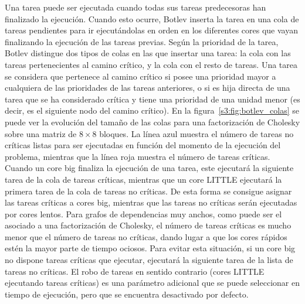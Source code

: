 Una tarea puede ser ejecutada cuando todas sus tareas predecesoras han
finalizado la ejecución. Cuando esto ocurre, Botlev inserta la tarea en una
cola de tareas pendientes para ir ejecutándolas en orden en los diferentes
cores que vayan finalizando la ejecución de las tareas previas. Según la
prioridad de la tarea, Botlev distingue dos tipos de colas en las que
insertar una tarea: la cola con las tareas pertenecientes al camino
crítico, y la cola con el resto de tareas. Una tarea se considera que
pertenece al camino crítico si posee una prioridad mayor a cualquiera de
las prioridades de las tareas anteriores, o si es hija directa de una tarea
que se ha considerado crítica y tiene una prioridad de una unidad menor (es
decir, es el siguiente nodo del camino crítico). En la
figura~\ref{s3:fig:botlev_colas} se puede ver la evolución del tamaño de
las colas para una factorización de Cholesky sobre una matriz de $8\times8$
bloques. La línea azul muestra el número de tareas no críticas listas para
ser ejecutadas en función del momento de la ejecución del problema,
mientras que la línea roja muestra el
número de tareas críticas.\\

Cuando un core big finaliza la ejecución de una tarea, este ejecutará la
siguiente tarea de la cola de tareas críticas, mientras que un core LITTLE
ejecutará la primera tarea de la cola de tareas no críticas. De esta forma
se consigue asignar las tareas críticas a cores big, mientras que las
tareas no críticas serán ejecutadas por cores lentos. Para grafos de
dependencias muy anchos, como puede ser el asociado a una factorización de
Cholesky, el número de tareas críticas es mucho menor que el número de
tareas no críticas, dando lugar a que los cores rápidos estén la mayor
parte de tiempo ociosos. Para evitar esta situación, si un core big no
dispone tareas críticas que ejecutar, ejecutará la siguiente tarea de la
lista de tareas no críticas. El robo de tareas en sentido contrario (cores
LITTLE ejecutando tareas críticas) es una parámetro adicional que se puede
seleccionar en tiempo de ejecución, pero que se encuentra desactivado por
defecto.





